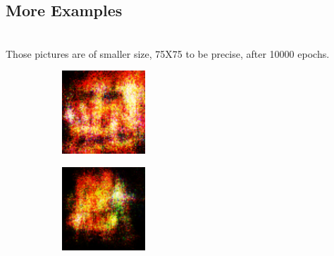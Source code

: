     \subsection{More Examples}\\
    Those pictures are of smaller size, 75X75 to be precise, after 10000 epochs. \\
    \begin{figure}[htb!]
    \centering
        \begin{subfigure}[htb!]{0.3\linewidth}
        \includegraphics[width=\linewidth]{10000-1(7575).pdf}
        \caption{}
        \end{subfigure}
        \begin{subfigure}[htb!]{0.3\linewidth}
        \includegraphics[width=\linewidth]{10000-2(7575).pdf}

\end{subfigure}
\end{figure}
